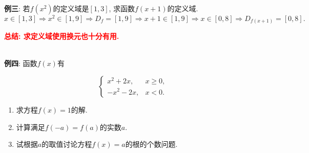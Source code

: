 \documentclass[8pt]{article}
\begin{document}
			~\\

			\textbf{例三}: 若$f(x^2)$的定义域是$[1, 3]$, 求函数$f(x+1)$的定义域.
				~\\

				$x\in [1, 3] \Rightarrow x^2 \in [1, 9] \Rightarrow D_{f}=[1, 9] \Rightarrow x+1\in[1, 9] \Rightarrow x\in[0, 8] \Rightarrow D_{f(x+1)}=[0, 8].$

				\textbf{\textcolor{red}{总结: 求定义域使用换元也十分有用.}}

			~\\

			\textbf{例四}: 函数$f(x)$有

				$$
				\left\{
				\begin{array}{rl}
				x^2+2x,&x\geq 0,\\
				-x^2-2x,&x<0.
				\end{array}
				\right.
				$$

				\begin{enumerate}[label=(\arabic*)]
					\item 求方程$f(x)=1$的解.
					\item 计算满足$f(-a)=f(a)$的实数$a$.
					\item 试根据$a$的取值讨论方程$f(x)=a$的根的个数问题.
				\end{enumerate}
				~\\
\end{document}
